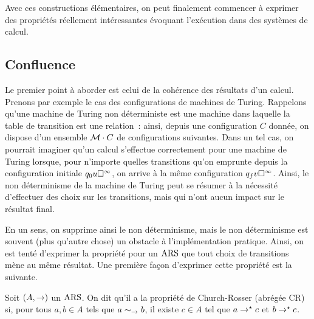 Avec ces constructions élémentaires, on peut finalement commencer à exprimer des
propriétés réellement intéressantes évoquant l'exécution dans des systèmes de
calcul.

\subsection{Confluence}

Le premier point à aborder est celui de la cohérence des résultats d'un calcul.
Prenons par exemple le cas des configurations de machines de Turing. Rappelons
qu'une machine de Turing non déterministe est une machine dans laquelle la
table de transition est une relation~: ainsi, depuis une configuration $C$
donnée, on dispose d'un ensemble $\mathcal{M}\mathbin{\cdot} C$ de configurations suivantes.
Dans un tel cas, on pourrait imaginer qu'un calcul
\og s'effectue correctement\fg
pour une machine de Turing lorsque, pour n'importe quelles transitions qu'on
emprunte depuis la configuration initiale $q_{0}u\square^{\infty}$, on arrive à la
même configuration $q_{f}v\square^{\infty}$. Ainsi, le non déterminisme de la
machine de Turing peut se résumer à la nécessité d'effectuer des choix sur les
transitions, mais qui n'ont aucun impact sur le résultat final.

En un sens, on supprime ainsi le non déterminisme, mais le non déterminisme est
souvent (plus qu'autre chose) un obstacle à l'implémentation pratique. Ainsi, on
est tenté d'exprimer la propriété pour un $\operatorname{ARS}$ que tout choix de transitions
mène au même résultat. Une première façon d'exprimer cette propriété est la
suivante.

\begin{definition}
  Soit $(A,\mathrel{\to})$ un $\operatorname{ARS}$. On dit qu'il a la propriété de Church-Rosser 
  (abrégée CR) si, pour tous $a,b \in A$ tels que $a \sim_{\mathord{\mathrel{\to}}} b$, il existe
  $c \in A$ tel que $a \mathrel{\to}^{\mathord{\star}} c$ et $b\mathrel{\to}^{\mathord{\star}} c$.
\end{definition}

